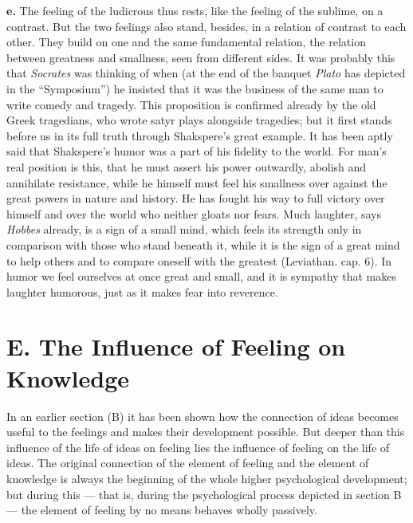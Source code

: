 \documentclass[12pt,a4paper]{book}
\newcommand{\opage}[1]{\marginnote{\footnotesize\textit{[#1]}}}
\begin{document}
\textbf{e.} The feeling of the ludicrous thus rests, like the feeling of
the sublime, on a contrast. But the two feelings also stand, besides, in
a relation of contrast to each other. They build on one and the same
fundamental relation, the relation between greatness and smallness, seen
from different sides. It was probably this that \emph{Socrates} was
thinking of when (at the end of the banquet \emph{Plato} has depicted
in the ``Symposium'') he insisted that it was the business of the same
man to write comedy and tragedy. This proposition is confirmed already
by the old Greek tragedians, who wrote satyr plays alongside tragedies;
but it first stands before us in its full truth through Shakspere's
great example. It has been aptly said that Shakspere's humor was a part
of his fidelity to the world. For man's real position is this, that he
must assert his power outwardly, abolish and annihilate resistance,
while he himself must feel his smallness over against the great powers
in nature and history. He has fought his way to full victory over
himself and over the world who neither gloats nor fears. Much laughter,
says \emph{Hobbes} already, is a sign of a small mind, which feels its
strength only in comparison with those who stand beneath it, while it is
the sign of a great mind to help others and to compare oneself with the
greatest (Leviathan. cap. 6). In humor we feel ourselves at once great
and small, and it is sympathy that makes laughter humorous, just as it
makes fear into reverence.

\opage{352}
\section*{E. The Influence of Feeling on Knowledge}

In an earlier section (B) it has been shown how the connection of ideas
becomes useful to the feelings and makes their development possible.
But deeper than this influence of the life of ideas on feeling lies the
influence of feeling on the life of ideas. The original connection of
the element of feeling and the element of knowledge is always the
beginning of the whole higher psychological development; but during
this --- that is, during the psychological process depicted in section
B --- the element of feeling by no means behaves wholly passively.
\end{document}
